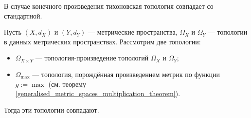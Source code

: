 \documentclass[12pt,a4paper]{article}
\begin{document}
    \begin{remark}
        В случае конечного произведения тихоновская топология совпадает со стандартной.
    \end{remark}

    \begin{theorem}
        Пусть $(X, d_X)$ и $(Y, d_Y)$ --- метрические пространства, $\Omega_X$ и $\Omega_Y$ --- топологии в данных метрических пространствах. Рассмотрим две топологии:
        \begin{itemize}
            \item $\Omega_{X \times Y}$ --- топология-произведение топологий $\Omega_X$ и $\Omega_Y$;
            \item $\Omega_{\max}$ --- топология, порождённая произведением метрик по функции $g := \max$ (см. теорему \ref{generalised_metric_spaces_multiplication_theorem}).
        \end{itemize}
        Тогда эти топологии совпадают.
    \end{theorem}
\end{document}
